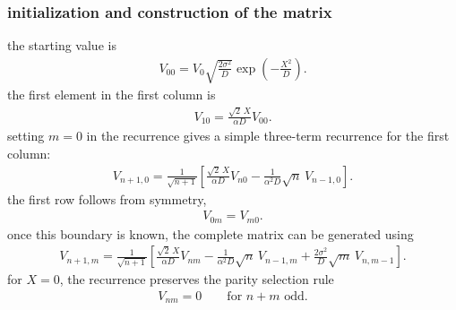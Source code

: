 \subsubsection{initialization and construction of the matrix}
the starting value is
\begin{align}
    V_{00}
    =
    V_0 \sqrt{\frac{2\sigma^2}{D}}
    \exp\left(-\frac{X^2}{D}\right).
\end{align}
the first element in the first column is
\begin{align}
    V_{10}
    =
    \frac{\sqrt{2}\,X}{\alpha D}V_{00}.
\end{align}
setting $m=0$ in the recurrence gives a simple three-term recurrence for
the first column:
\begin{align}
    \boxed{
        V_{n+1,0}
        =
        \frac{1}{\sqrt{n+1}}
        \left[
            \frac{\sqrt{2}\,X}{\alpha D}V_{n0}
            -
            \frac{1}{\alpha^2 D}\sqrt{n}\,V_{n-1,0}
            \right].
    }
\end{align}
the first row follows from symmetry,
\begin{align}
    V_{0m}=V_{m0}.
\end{align}
once this boundary is known, the complete matrix can be generated using
\begin{align}
    \boxed{
        V_{n+1,m}
        =
        \frac{1}{\sqrt{n+1}}
        \left[
            \frac{\sqrt{2}\,X}{\alpha D}V_{nm}
            -
            \frac{1}{\alpha^2 D}\sqrt{n}\,V_{n-1,m}
            +
            \frac{2\sigma^2}{D}\sqrt{m}\,V_{n,m-1}
            \right].
    }
\end{align}
for $X=0$, the recurrence preserves the parity selection rule
\begin{align}
    V_{nm}=0
    \qquad\text{for }n+m\text{ odd}.
\end{align}
